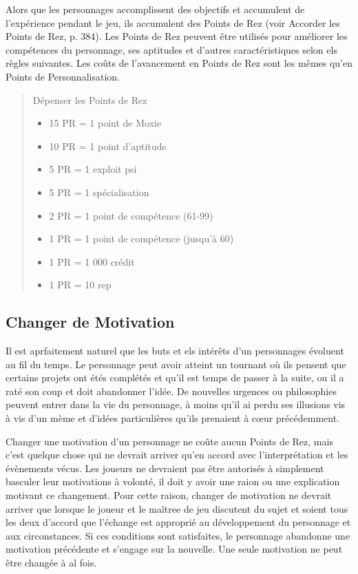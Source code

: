 Alors que les personnages accomplissent des objectifs et accumulent de l'expérience pendant le jeu, ils accumulent des Points de Rez (voir Accorder les Points de Rez, p. 384). Les Points de Rez peuvent être utilisés pour améliorer les compétences du personnage, ses aptitudes et d'autres caractéristiques selon els règles suivantes. Les coûts de l'avancement en Points de Rez sont les mêmes qu'en Points de Personnalisation. 

\begin{quotation} Dépenser les Points de Rez 

\begin{itemize} \item 15 PR = 1 point de Moxie \item 10 PR = 1 point d'aptitude \item 5 PR = 1 exploit psi \item 5 PR = 1 spécialisation \item 2 PR = 1 point de compétence (61-99) \item 1 PR = 1 point de compétence (jusqu'à 60) \item 1 PR = 1 000 crédit \item 1 PR = 10 rep \end{itemize} \end{quotation} 

\subsection{Changer de Motivation} \label{sec:changing-motivation} 

Il est aprfaitement naturel que les buts et els intérêts d'un personnages évoluent au fil du temps. Le personnage peut avoir atteint un tournant où ils pensent que certains projets ont étés complétés et qu'il est temps de passer à la suite, ou il a raté son coup et doit abandonner l'idée. De nouvelles urgences ou philosophies peuvent entrer dans la vie du personnage, à moins qu'il ai perdu ses illusions vis à vis d'un mème et d'idées particulières qu'ils prenaient à cœur précédemment. 

Changer une motivation d'un personnage ne coûte aucun Points de Rez, mais c'est quelque chose qui ne devrait arriver qu'en accord avec l'interprétation et les évènements vécus. Les joueurs ne devraient pas être autorisés à simplement basculer leur motivations à volonté, il doit y avoir une raion ou une explication motivant ce changement. Pour cette raison, changer de motivation ne devrait arriver que lorsque le joueur et le maîtree de jeu discutent du sujet et soient tous les deux d'accord que l'échange est approprié au développement du personnage et aux circonstances. Si ces conditions sont satisfaites, le personnage abandonne une motivation précédente et s'engage sur la nouvelle. Une seule motivation ne peut être changée à al fois. 

